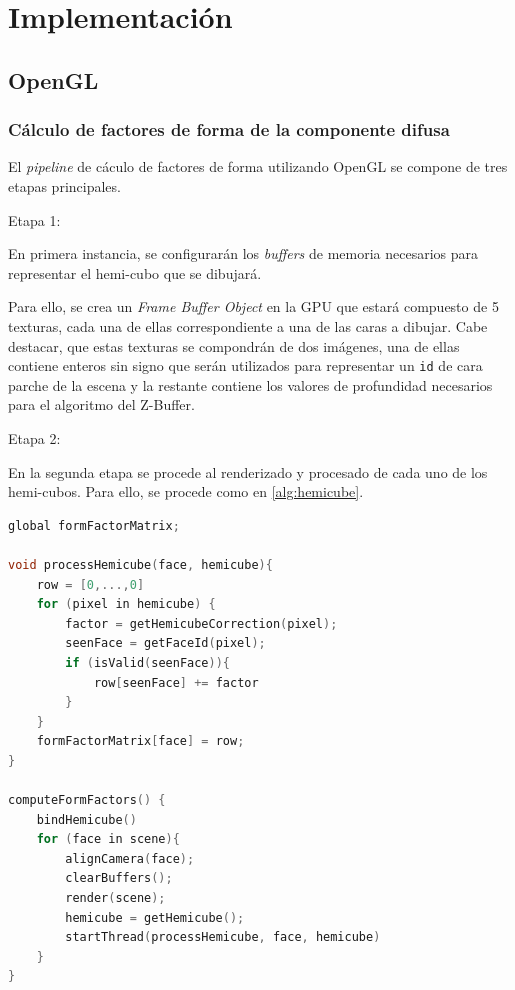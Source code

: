 \chapter{Implementación}
\label{ch:chap04}

\section{OpenGL}
\label{sec:opengl-impl}

\subsection{Cálculo de factores de forma de la componente difusa}

El \textit{pipeline} de cáculo de factores de forma utilizando OpenGL se compone de tres etapas principales.

Etapa 1:

En primera instancia, se configurarán los \textit{buffers} de memoria necesarios para representar el hemi-cubo que se dibujará.

Para ello, se crea un \textit{Frame Buffer Object} en la GPU que estará compuesto de 5 texturas, cada una de ellas correspondiente a una de las caras a dibujar. Cabe destacar, que estas texturas se compondrán de dos imágenes, una de ellas contiene enteros sin signo que serán utilizados para representar un \verb|id| de cara parche de la escena y la restante contiene los valores de profundidad necesarios para el algoritmo del Z-Buffer.

Etapa 2:

En la segunda etapa se procede al renderizado y procesado de cada uno de los hemi-cubos. Para ello, se procede como en \ref{alg:hemicube}.

\begin{minipage}{\linewidth}
\label{alg:hemicube}
\begin{lstlisting}[language=C]
global formFactorMatrix;

void processHemicube(face, hemicube){
	row = [0,...,0]
	for (pixel in hemicube) {
		factor = getHemicubeCorrection(pixel);
		seenFace = getFaceId(pixel);
		if (isValid(seenFace)){
			row[seenFace] += factor
		}
	}
	formFactorMatrix[face] = row;
}

computeFormFactors() {
	bindHemicube()
	for (face in scene){
		alignCamera(face);
		clearBuffers();
		render(scene);
		hemicube = getHemicube();
		startThread(processHemicube, face, hemicube)
	}
}

\end{lstlisting}
\end{minipage}

